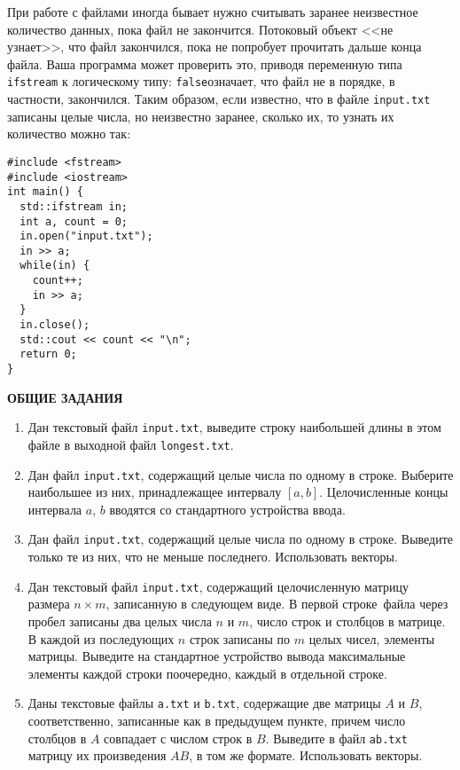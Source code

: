 \documentclass{article}
\begin{document}
При работе с файлами иногда бывает нужно считывать заранее неизвестное количество данных, пока файл не закончится. Потоковый объект <<не узнает>>, что файл закончился, пока не попробует прочитать дальше конца файла. Ваша программа может проверить это, приводя переменную типа \texttt{ifstream} к логическому типу: \texttt{false}означает, что файл не в порядке, в частности, закончился. Таким образом, если известно, что в файле \texttt{input.txt} записаны целые числа, но неизвестно заранее, сколько их, то узнать их количество можно так:

\begin{verbatim}
#include <fstream>
#include <iostream>
int main() {
  std::ifstream in;
  int a, count = 0;
  in.open("input.txt");
  in >> a;
  while(in) {
    count++;
    in >> a;
  }
  in.close();
  std::cout << count << "\n";
  return 0;
}
\end{verbatim}






\newpage






\begin{center}
\textbf{ОБЩИЕ ЗАДАНИЯ}
\end{center}

\sloppy
\begin{enumerate}
\item
Дан текстовый файл \texttt{input.txt}, выведите строку наибольшей длины в этом файле в выходной файл \texttt{longest.txt}.
\item
Дан файл \texttt{input.txt}, содержащий целые числа по одному в строке. Выберите наибольшее из них, принадлежащее интервалу $[a, b]$. Целочисленные концы интервала $a$, $b$ вводятся со стандартного устройства ввода.
\item
Дан файл \texttt{input.txt}, содержащий целые числа по одному в строке. Выведите только те из них, что не меньше последнего. Использовать векторы.
\item
Дан текстовый файл \texttt{input.txt}, содержащий целочисленную матрицу размера $n\times m$, записанную в следующем виде. В первой строке файла через пробел записаны два целых числа $n$ и $m$, число строк и столбцов в матрице. В каждой из последующих $n$ строк записаны по $m$ целых чисел, элементы матрицы. Выведите на стандартное устройство вывода максимальные элементы каждой строки поочередно, каждый в отдельной строке.
\item
Даны текстовые файлы \texttt{a.txt} и \texttt{b.txt}, содержащие две матрицы $A$ и $B$, соответственно, записанные как в предыдущем пункте, причем число столбцов в $A$ совпадает с числом строк в $B$. Выведите в файл \texttt{ab.txt} матрицу их произведения $AB$, в том же формате. Использовать векторы.
\end{enumerate}
\end{document}

